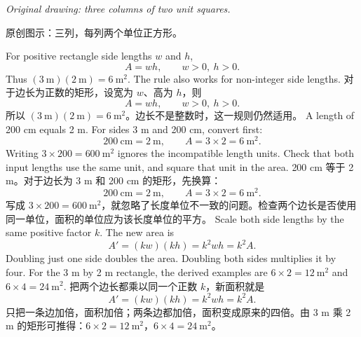  {\begin{center}\end{center}\textit{Original drawing: three columns of two unit squares.}}
 {\begin{center}\end{center}原创图示：三列，每列两个单位正方形。}
 {For positive rectangle side lengths $w$ and $h$, \[A=wh,\qquad w>0,\ h>0.\] Thus $(3\ \mathrm{m})(2\ \mathrm{m})=6\ \mathrm{m^2}$. The rule also works for non-integer side lengths.}
 {对于边长为正数的矩形，设宽为 $w$、高为 $h$，则 \[A=wh,\qquad w>0,\ h>0.\] 所以 $(3\ \mathrm{m})(2\ \mathrm{m})=6\ \mathrm{m^2}$。边长不是整数时，这一规则仍然适用。}
 {A length of 200 cm equals 2 m. For sides 3 m and 200 cm, convert first: \[200\ \mathrm{cm}=2\ \mathrm{m},\qquad A=3\times2=6\ \mathrm{m^2}.\] Writing $3\times200=600\ \mathrm{m^2}$ ignores the incompatible length units. Check that both input lengths use the same unit, and square that unit in the area.}
 {200 cm 等于 2 m。对于边长为 3 m 和 200 cm 的矩形，先换算：\[200\ \mathrm{cm}=2\ \mathrm{m},\qquad A=3\times2=6\ \mathrm{m^2}.\] 写成 $3\times200=600\ \mathrm{m^2}$，就忽略了长度单位不一致的问题。检查两个边长是否使用同一单位，面积的单位应为该长度单位的平方。}
 {Scale both side lengths by the same positive factor $k$. The new area is \[A'=(kw)(kh)=k^2wh=k^2A.\] Doubling just one side doubles the area. Doubling both sides multiplies it by four. For the 3 m by 2 m rectangle, the derived examples are $6\times2=12\ \mathrm{m^2}$ and $6\times4=24\ \mathrm{m^2}$.}
 {把两个边长都乘以同一个正数 $k$，新面积就是 \[A'=(kw)(kh)=k^2wh=k^2A.\] 只把一条边加倍，面积加倍；两条边都加倍，面积变成原来的四倍。由 3 m 乘 2 m 的矩形可推得：$6\times2=12\ \mathrm{m^2}$，$6\times4=24\ \mathrm{m^2}$。}
